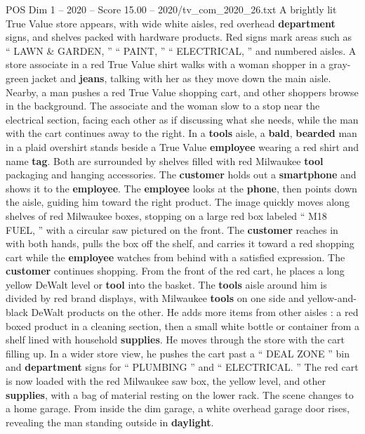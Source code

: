\begin{textsample}{POS Dim 1 – 2020 – Score 15.00 – 2020/tv\_com\_2020\_26.txt}  \label{ex:f1_pos_014}
A brightly lit True Value store appears, with wide white aisles, red overhead \textbf{department} signs, and shelves packed with hardware products.
Red signs mark areas such as “ LAWN \& GARDEN, ” “ PAINT, ” “ ELECTRICAL, ” and numbered aisles.
A store associate in a red True Value shirt walks with a woman shopper in a gray-green jacket and \textbf{jeans}, talking with her as they move down the main aisle.
Nearby, a man pushes a red True Value shopping cart, and other shoppers browse in the background.
The associate and the woman slow to a stop near the electrical section, facing each other as if discussing what she needs, while the man with the cart continues away to the right.
In a \textbf{tools} aisle, a \textbf{bald}, \textbf{bearded} man in a plaid overshirt stands beside a True Value \textbf{employee} wearing a red shirt and name \textbf{tag}.
Both are surrounded by shelves filled with red Milwaukee \textbf{tool} packaging and hanging accessories.
The \textbf{customer} holds out a \textbf{smartphone} and shows it to the \textbf{employee}.
The \textbf{employee} looks at the \textbf{phone}, then points down the aisle, guiding him toward the right product.
The image quickly moves along shelves of red Milwaukee boxes, stopping on a large red box labeled “ M18 FUEL, ” with a circular saw pictured on the front.
The \textbf{customer} reaches in with both hands, pulls the box off the shelf, and carries it toward a red shopping cart while the \textbf{employee} watches from behind with a satisfied expression.
The \textbf{customer} continues shopping.
From the front of the red cart, he places a long yellow DeWalt level or \textbf{tool} into the basket.
The \textbf{tools} aisle around him is divided by red brand displays, with Milwaukee \textbf{tools} on one side and yellow-and-black DeWalt products on the other.
He adds more items from other aisles : a red boxed product in a cleaning section, then a small white bottle or container from a shelf lined with household \textbf{supplies}.
He moves through the store with the cart filling up.
In a wider store view, he pushes the cart past a “ DEAL ZONE ” bin and \textbf{department} signs for “ PLUMBING ” and “ ELECTRICAL. ” The red cart is now loaded with the red Milwaukee saw box, the yellow level, and other \textbf{supplies}, with a bag of material resting on the lower rack.
The scene changes to a home garage.
From inside the dim garage, a white overhead garage door rises, revealing the man standing outside in \textbf{daylight}.

\end{textsample}
